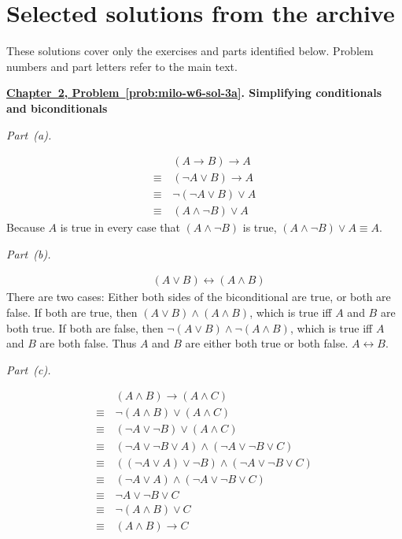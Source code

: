 \documentclass[11pt,letterpaper,oneside,openany]{book}
\newif\ifshowsolutions
\newcounter{problem}[chapter]
\newcommand{\problemref}[2]{\hyperref[prob:#2]{Chapter~#1, Problem~\ref*{prob:#2}}}
\newcommand{\solutionheading}[3]{\par\addvspace{12pt}\Needspace{4\baselineskip}\textbf{\problemref{#1}{#2}. #3}\par\nobreak}
\begin{document}
\fi %

\ifshowsolutions
\chapter{Selected solutions from the archive}
These solutions cover only the exercises and parts identified below. Problem numbers and part letters refer to the main text.

\solutionheading{2}{milo-w6-sol-3a}{Simplifying conditionals and biconditionals}
\par\medskip\noindent\textit{Part~(a).}\par\nobreak
\begin{align*}
    & (A \to B) \to A \\
    \equiv\, & (\neg A \lor B) \to A \tag{Definition of material conditional} \\
    \equiv\, & \neg(\neg A \lor B) \lor A \tag{Definition of material conditional} \\
    \equiv\, & (A \land \neg B) \lor A \tag{De Morgan's law}    
\end{align*}
Because $A$ is true in every case that $(A \land \neg B)$ is true, $(A \land \neg B) \lor A \equiv \boxed{A}$.

\par\medskip\noindent\textit{Part~(b).}\par\nobreak
\begin{align*}
    & (A \lor B) \leftrightarrow (A \land B)
\end{align*}
There are two cases: Either both sides of the biconditional are true, or both are false. If both are true, then $(A \lor B) \land (A \land B)$, which is true iff $A$ and $B$ are both true. If both are false, then $\neg (A \lor B) \land \neg(A \land B)$, which is true iff $A$ and $B$ are both false. Thus $A$ and $B$ are either both true or both false. $\boxed{A \leftrightarrow B}$.

\par\medskip\noindent\textit{Part~(c).}\par\nobreak
\begin{align*}
&(A \land B) \to (A \land C) \\
\equiv\, & \neg(A \land B) \lor (A \land C) \tag{Definition of material conditional} \\
\equiv\, & (\neg A \lor \neg B) \lor (A \land C) \tag{De Morgan's law} \\
\equiv\, & (\neg A \lor \neg B \lor A) \land (\neg A \lor \neg B \lor C) \tag{Distribution} \\
\equiv\, & ((\neg A \lor A) \lor \neg B) \land (\neg A \lor \neg B \lor C) \tag{Commutativity} \\
\equiv\, & (\neg A \lor A) \land (\neg A \lor \neg B \lor C) \tag{Tautological disjunct} \\
\equiv\, & \neg A \lor \neg B \lor C \tag{Tautological conjunct} \\
\equiv\, & \neg (A \land B) \lor C \tag{De Morgan's law} \\
\equiv\, & (A \land B) \to C \tag{Definition of material conditional}
\end{align*}
\end{document}
